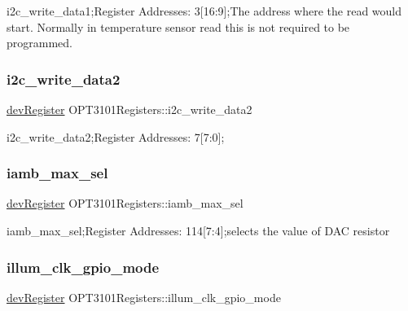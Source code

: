 i2c\+\_\+write\+\_\+data1;Register Addresses\+: 3\mbox{[}16\+:9\mbox{]};The address where the read would start. Normally in temperature sensor read this is not required to be programmed. 

\mbox{\label{class_o_p_t3101_registers_a60f82b6d2ba125322a2bbd5a19d8cb24}} 
\subsubsection{\texorpdfstring{i2c\+\_\+write\+\_\+data2}{i2c\_write\_data2}}
{\footnotesize\ttfamily \mbox{\hyperlink{classdev_register}{dev\+Register}} O\+P\+T3101\+Registers\+::i2c\+\_\+write\+\_\+data2}



i2c\+\_\+write\+\_\+data2;Register Addresses\+: 7\mbox{[}7\+:0\mbox{]}; 

\mbox{\label{class_o_p_t3101_registers_afc1b16c376d9ac5d8991c247ef3546e6}} 
\subsubsection{\texorpdfstring{iamb\+\_\+max\+\_\+sel}{iamb\_max\_sel}}
{\footnotesize\ttfamily \mbox{\hyperlink{classdev_register}{dev\+Register}} O\+P\+T3101\+Registers\+::iamb\+\_\+max\+\_\+sel}



iamb\+\_\+max\+\_\+sel;Register Addresses\+: 114\mbox{[}7\+:4\mbox{]};selects the value of D\+AC resistor 

\mbox{\label{class_o_p_t3101_registers_a8179b5fcd502e8d457cffefa3d29fbfa}} 
\subsubsection{\texorpdfstring{illum\+\_\+clk\+\_\+gpio\+\_\+mode}{illum\_clk\_gpio\_mode}}
{\footnotesize\ttfamily \mbox{\hyperlink{classdev_register}{dev\+Register}} O\+P\+T3101\+Registers\+::illum\+\_\+clk\+\_\+gpio\+\_\+mode}



